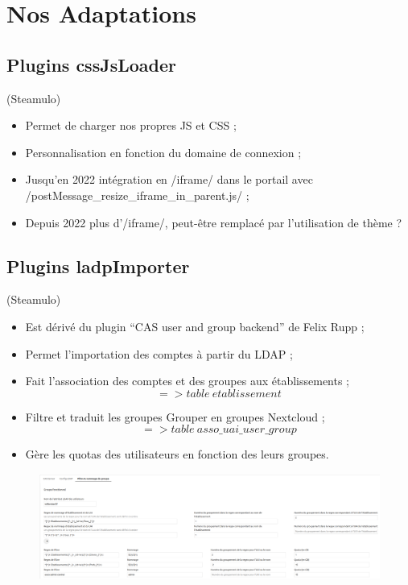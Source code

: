 \section{Nos Adaptations}
\subsection{Plugins cssJsLoader}
\begin{frame}[fragile]{\sub}{(Steamulo)}
\begin{itemize}
\item Permet de charger nos propres JS et CSS ;
\item Personnalisation en fonction du domaine de connexion ;
\item Jusqu'en 2022 intégration en \code/iframe/ dans le portail avec \code/postMessage_resize_iframe_in_parent.js/ ;
\item Depuis 2022 plus d'\code/iframe/, peut-être remplacé par l'utilisation de thème ? 
\end{itemize}
\end{frame} 

\subsection{Plugins ladpImporter}
\begin{frame}{\sub}{(Steamulo)} %
\begin{itemize}
\item Est dérivé du plugin ``CAS user and group backend'' de Felix Rupp ;
\item Permet l'importation des comptes à partir du LDAP ;
\item Fait l'association des comptes et des groupes aux établissements ;
		{\small $$ => table\ etablissement $$} 
\item Filtre et traduit les groupes Grouper en groupes Nextcloud ;
		{\small $$ => table\ asso\_uai\_user\_group $$ } 
\item Gère les quotas des utilisateurs en fonction des leurs groupes.
\end{itemize}
\end{frame}


\begin{frame}{\sub} %
\begin{figure}
\includegraphics[width=\textwidth, height=0.85\textheight]{ldapimporter.png}
\end{figure}
\end{frame}

